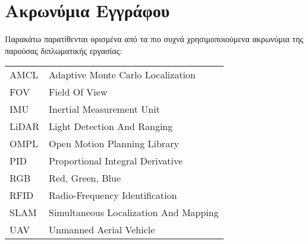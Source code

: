 \chapter*{Ακρωνύμια Εγγράφου}
\label{append:acronyms}
{}

Παρακάτω παρατίθενται ορισμένα από τα πιο συχνά χρησιμοποιούμενα ακρωνύμια της
παρούσας διπλωματικής εργασίας:

\begin{table}[htpb]
  \centering
  \begin{tabular}{l@{$\;\;\longrightarrow\;\;$}l}
    AMCL & Adaptive Monte Carlo Localization \\
    FOV & Field Of View \\ 
    IMU & Inertial Measurement Unit \\
    LiDAR & Light Detection And Ranging \\
    OMPL & Open Motion Planning Library \\
    PID & Proportional Integral Derivative \\
    RGB & Red, Green, Blue \\
    RFID & Radio-Frequency Identification \\
    SLAM & Simultaneous Localization And Mapping \\
    UAV & Unmanned Aerial Vehicle
    

  \end{tabular}
\end{table}
